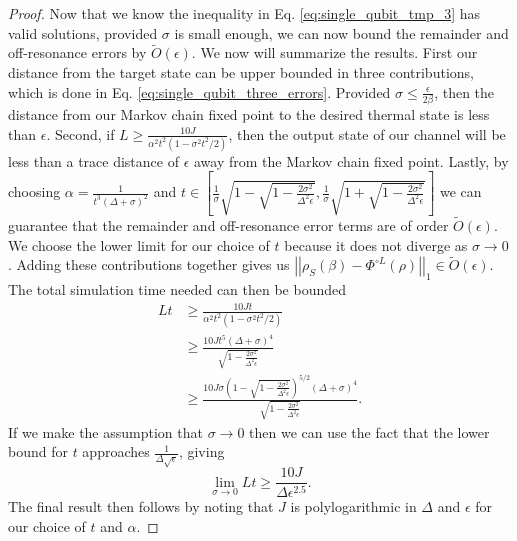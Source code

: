 \documentclass{article}
\newcommand{\matt}[1]{\todo[color=red!50, prepend, caption={Matt}, tickmarkheight=0.25cm]{#1}}
\newcommand{\norm}[1]{\left|\left| #1 \right|\right|}
\newcommand{\bigo}[1]{O\left(#1\right)}
\newcommand{\bigotilde}[1]{\widetilde{O} \left( #1 \right)}
\begin{document}
\begin{proof}
Now that we know the inequality in Eq. \eqref{eq:single_qubit_tmp_3} has valid solutions, provided $\sigma$ is small enough, we can now bound the remainder and off-resonance errors by $\bigotilde{\epsilon}$. 
We now will summarize the results. First our distance from the target state can be upper bounded in three contributions, which is done in Eq. \eqref{eq:single_qubit_three_errors}.
Provided $\sigma \le \frac{\epsilon}{2 \beta}$, then the distance from our Markov chain fixed point to the desired thermal state is less than $\epsilon$. Second, if $L \ge \frac{10 J}{\alpha^2 t^2(1 - \sigma^2 t^2 /2) }$, then the output state of our channel will be less than a trace distance of $\epsilon$ away from the Markov chain fixed point. Lastly, by choosing $\alpha  = \frac{1}{t^3(\Delta + \sigma)^2}$ and $t \in \left[ \frac{1}{\sigma}\sqrt{1 - \sqrt{1 - \frac{2 \sigma^2}{\Delta^2 \epsilon}} }, \frac{1}{\sigma}\sqrt{1 + \sqrt{1 - \frac{2 \sigma^2}{\Delta^2 \epsilon}} } \right]$ we can guarantee that the remainder and off-resonance error terms are of order $\bigotilde{\epsilon}$.  We choose the lower limit for our choice of $t$ because it does not diverge as $\sigma\rightarrow 0$.  Adding these contributions together gives us $\norm{\rho_S(\beta) - \Phi^{\circ L }(\rho)}_1 \in \bigotilde{\epsilon}$. The total simulation time needed can then be bounded
\begin{align}
    Lt &\ge \frac{10 J t}{\alpha^2 t^2 (1 - \sigma^2 t^2 / 2)} \\
    &\ge \frac{10 J t^5 (\Delta + \sigma)^4}{\sqrt{1 - \frac{2 \sigma^2}{\Delta^2 \epsilon}}} \\
    &\ge \frac{10 J \sigma \left( 1 - \sqrt{1 - \frac{2 \sigma^2}{\Delta^2 \epsilon}}\right)^{5/2} (\Delta + \sigma)^4}{\sqrt{1 - \frac{2 \sigma^2}{\Delta^2 \epsilon}}}.
\end{align}
If we make the assumption that $\sigma \to 0$ then we can use the fact that the lower bound for $t$ approaches $\frac{1}{\Delta \sqrt{\epsilon}}$, giving
\begin{equation}
    \lim_{\sigma \to 0} Lt \ge \frac{10 J}{\Delta \epsilon^{2.5}}.
\end{equation}
The final result then follows by noting that $J$ is polylogarithmic in $\Delta$ and $\epsilon$ for our choice of $t$ and $\alpha$.
 \end{proof}
\end{document}
